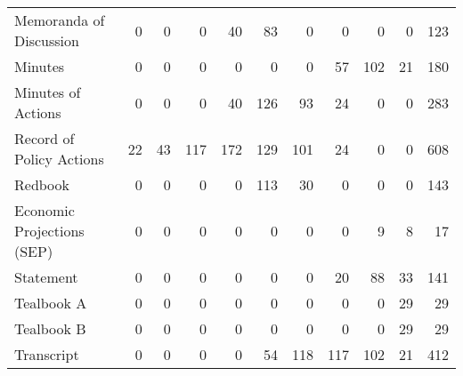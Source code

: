 \begin{tabular}{lrrrrrrrrrr}
    Memoranda of Discussion &                        0 &                        0 &                        0 &                       40 &                       83 &                        0 &                        0 &                        0 &                        0 &   123 \\
                    Minutes &                        0 &                        0 &                        0 &                        0 &                        0 &                        0 &                       57 &                      102 &                       21 &   180 \\
         Minutes of Actions &                        0 &                        0 &                        0 &                       40 &                      126 &                       93 &                       24 &                        0 &                        0 &   283 \\
   Record of Policy Actions &                       22 &                       43 &                      117 &                      172 &                      129 &                      101 &                       24 &                        0 &                        0 &   608 \\
                    Redbook &                        0 &                        0 &                        0 &                        0 &                      113 &                       30 &                        0 &                        0 &                        0 &   143 \\
 Economic Projections (SEP) &                        0 &                        0 &                        0 &                        0 &                        0 &                        0 &                        0 &                        9 &                        8 &    17 \\
                  Statement &                        0 &                        0 &                        0 &                        0 &                        0 &                        0 &                       20 &                       88 &                       33 &   141 \\
                 Tealbook A &                        0 &                        0 &                        0 &                        0 &                        0 &                        0 &                        0 &                        0 &                       29 &    29 \\
                 Tealbook B &                        0 &                        0 &                        0 &                        0 &                        0 &                        0 &                        0 &                        0 &                       29 &    29 \\
                 Transcript &                        0 &                        0 &                        0 &                        0 &                       54 &                      118 &                      117 &                      102 &                       21 &   412 \\
\bottomrule
\end{tabular}

